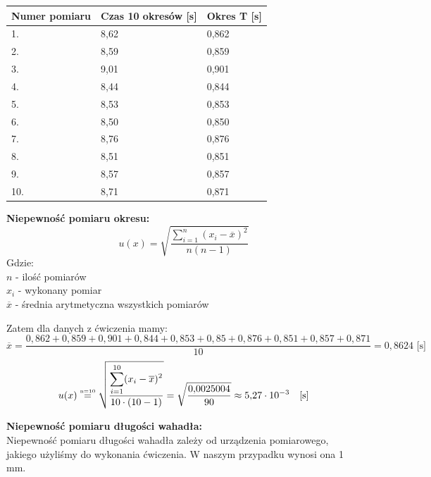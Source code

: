 \documentclass[a4paper,11pt]{article}
\begin{document}
\begin{table}[h]
\centering
\begin{tabular}{|l|l|l|}
\hline
Numer pomiaru & Czas 10 okresów {[}s{]} & Okres T {[}s{]} \\ \hline
1.            & 8,62                    & 0,862                 \\ \hline
2.            & 8,59                    & 0,859                 \\ \hline
3.            & 9,01                    & 0,901                 \\ \hline
4.            & 8,44                    & 0,844                 \\ \hline
5.            & 8,53                    & 0,853                 \\ \hline
6.            & 8,50                    & 0,850                 \\ \hline
7.            & 8,76                    & 0,876                 \\ \hline
8.            & 8,51                    & 0,851                 \\ \hline
9.            & 8,57                    & 0,857                 \\ \hline
10.           & 8,71                    & 0,871                 \\ \hline
\end{tabular}
\end{table}

\noindent \textbf{Niepewność pomiaru okresu:} $$ u(x) = \sqrt{\frac{\displaystyle\sum_{i=1}^{n} (x_i - \overline{x})^2}{n(n-1)}}$$
Gdzie: \\
$n$ - ilość pomiarów \\
$x_i$ - wykonany pomiar \\
$\overline{x}$ - średnia arytmetyczna wszystkich pomiarów

\noindent Zatem dla danych z ćwiczenia mamy:
$$\overline{x} = \frac{0{,}862 +0{,}859 +0{,}901+0{,}844+0{,}853+0{,}85+0{,}876+0{,}851+0{,}857+0{,}871}{10} =0{,}8624 \textrm{ [s]} $$ 
$$ u(x) \stackrel{\textrm{\tiny n=10}}{=} \sqrt{\frac{\displaystyle\sum_{i=1}^{10} (x_i - \overline{x})^2}{10\cdot(10-1)}} = 
\sqrt{\frac{0{,}0025004}{90}}
\approx 5{,}27\cdot 10^{-3}\quad\textrm{[s]}$$

\noindent \textbf{Niepewność pomiaru długości wahadła:}\\
Niepewność pomiaru długości wahadła zależy od urządzenia pomiarowego, jakiego użyliśmy do wykonania ćwiczenia. W naszym przypadku wynosi ona 1 mm.
\end{document}
